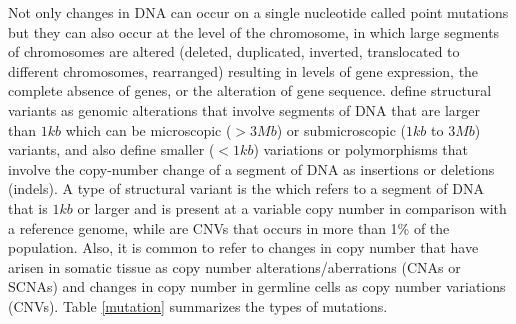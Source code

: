 Not only changes in DNA can occur on a single nucleotide called point mutations but they can
also occur at the level of the chromosome, in which large segments of chromosomes are altered
(deleted, duplicated, inverted, translocated to different chromosomes, rearranged)
resulting in levels of gene expression, the complete absence of genes, or the alteration of gene sequence.
 define structural variants as genomic alterations that involve segments
of DNA that are larger than $1 kb$ which can be microscopic ($> 3Mb$) or submicroscopic ($1 kb$ to $3 Mb$) variants,
and also define smaller ($<1 kb$) variations or polymorphisms that involve the copy-number change
 of a segment of DNA as insertions or deletions (indels).
A type of structural variant is the  which refers to a segment of DNA that is $1 kb$ or larger and is present at a variable copy number in comparison with a reference genome, while  are CNVs that occurs in more than 1\% of the population. Also, it is common to refer to changes in copy number that have arisen in somatic tissue as copy number alterations/aberrations (CNAs or SCNAs) and changes in copy number in germline cells
 as copy number variations (CNVs).
Table \ref{mutation} summarizes the types of mutations.




